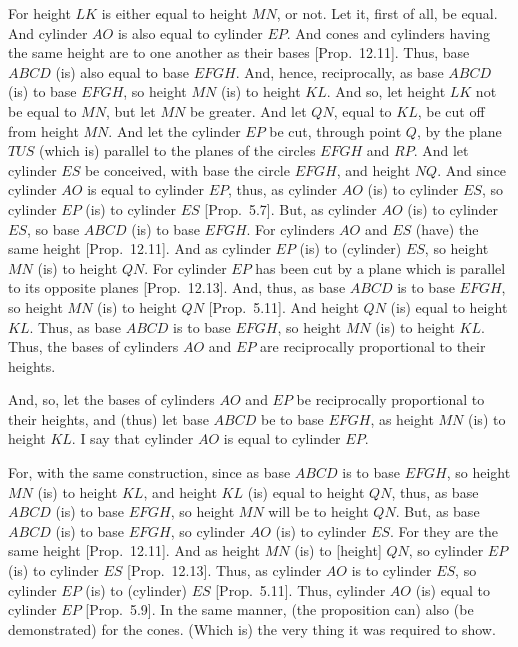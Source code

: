 \begin{Parallel}{}{}
{For height $LK$ is either equal to height $MN$, or not. Let it, first of all, be equal. And cylinder $AO$ is also equal to cylinder $EP$.
And cones and cylinders having the same height are to one another as their bases [Prop.~12.11]. 
Thus, base $ABCD$ (is) also equal to base $EFGH$. And, hence, reciprocally, as base $ABCD$ (is) to base $EFGH$,
so height $MN$ (is) to height $KL$. And so, let height $LK$ not be equal to $MN$, but let $MN$ be greater. And let $QN$, equal to
$KL$, be cut off from height $MN$. And let the cylinder $EP$ be cut, through point $Q$, by the plane $TUS$ (which is)
parallel to the planes of the circles $EFGH$ and $RP$. And let cylinder $ES$ be conceived, with base the circle $EFGH$, and
height $NQ$. And since cylinder $AO$ is equal to cylinder $EP$, thus, as cylinder $AO$ (is) to cylinder $ES$, so cylinder
$EP$ (is) to cylinder $ES$ [Prop.~5.7]. But, as cylinder $AO$ (is) to cylinder $ES$, so base $ABCD$ (is)
to base $EFGH$. For cylinders $AO$ and $ES$ (have)  the same height [Prop.~12.11]. 
And as cylinder $EP$ (is) to (cylinder) $ES$, so height $MN$ (is) to height  $QN$. For cylinder $EP$
has been cut by a plane which is parallel to its opposite planes [Prop.~12.13].
And, thus, as base $ABCD$ is to base $EFGH$, so height $MN$ (is) to height $QN$ [Prop.~5.11]. And height $QN$
(is) equal to height $KL$. Thus, as base $ABCD$ is to base $EFGH$, so height $MN$ (is) to height $KL$.
Thus, the bases of cylinders $AO$ and $EP$ are reciprocally proportional to their heights.

And, so, let the bases of cylinders $AO$ and $EP$ be reciprocally proportional to their heights, and (thus) let
base $ABCD$ be to base $EFGH$, as height $MN$ (is) to height $KL$. I say that cylinder $AO$ is equal to
cylinder $EP$.

For, with the same construction, since  as base $ABCD$ is to base $EFGH$, so  height $MN$ (is) to height $KL$, and
height $KL$ (is) equal to height $QN$, thus, as base $ABCD$ (is) to base $EFGH$, so height $MN$ will be to height $QN$.
But, as base $ABCD$ (is) to base $EFGH$, so cylinder $AO$ (is) to cylinder $ES$. For they are the same height [Prop.~12.11]. 
And as height $MN$ (is) to [height] $QN$, so cylinder $EP$ (is) to cylinder $ES$ [Prop.~12.13].
Thus, as cylinder $AO$ is to cylinder $ES$, so cylinder $EP$ (is) to (cylinder) $ES$ [Prop.~5.11]. Thus, cylinder $AO$ (is)
equal to cylinder $EP$ [Prop.~5.9]. In the same manner, (the proposition can) also (be demonstrated)
for the cones. (Which is) the very thing it was required to show.}
\end{Parallel}

